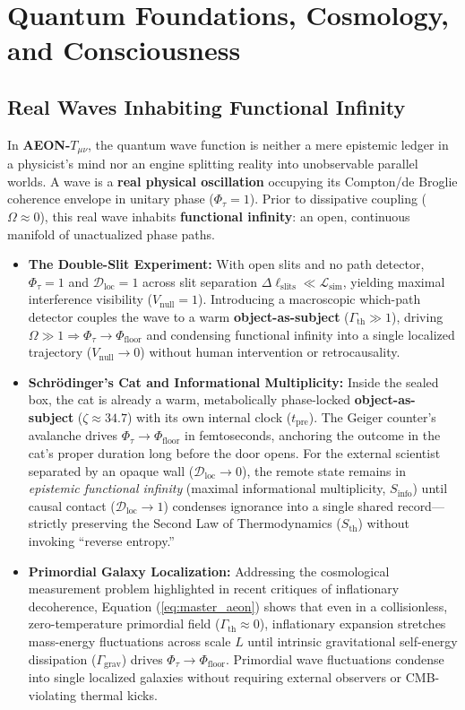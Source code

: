 \documentclass[11pt,a4paper]{article}
\begin{document}
\section{Quantum Foundations, Cosmology, and Consciousness}

\subsection{Real Waves Inhabiting Functional Infinity}
In \textbf{AEON-$T_{\mu\nu}$}, the quantum wave function is neither a mere epistemic ledger in a physicist's mind nor an engine splitting reality into unobservable parallel worlds. A wave is a \textbf{real physical oscillation} occupying its Compton/de Broglie coherence envelope in unitary phase ($\Phi_\tau = 1$). Prior to dissipative coupling ($\Omega \approx 0$), this real wave inhabits \textbf{functional infinity}: an open, continuous manifold of unactualized phase paths.

\begin{itemize}[leftmargin=1.5em]
    \item \textbf{The Double-Slit Experiment:} With open slits and no path detector, $\Phi_\tau = 1$ and $\mathcal{D}_{\text{loc}} = 1$ across slit separation $\Delta\ell_{\text{slits}} \ll \mathcal{L}_{\text{sim}}$, yielding maximal interference visibility ($V_{\text{null}} = 1$). Introducing a macroscopic which-path detector couples the wave to a warm \textbf{object-as-subject} ($\Gamma_{\text{th}} \gg 1$), driving $\Omega \gg 1 \Rightarrow \Phi_\tau \to \Phi_{\text{floor}}$ and condensing functional infinity into a single localized trajectory ($V_{\text{null}} \to 0$) without human intervention or retrocausality.
    \item \textbf{Schrödinger's Cat and Informational Multiplicity:} Inside the sealed box, the cat is already a warm, metabolically phase-locked \textbf{object-as-subject} ($\zeta \approx 34.7$) with its own internal clock ($t_{\text{pre}}$). The Geiger counter's avalanche drives $\Phi_\tau \to \Phi_{\text{floor}}$ in femtoseconds, anchoring the outcome in the cat's proper duration long before the door opens. For the external scientist separated by an opaque wall ($\mathcal{D}_{\text{loc}} \to 0$), the remote state remains in \textit{epistemic functional infinity} (maximal informational multiplicity, $S_{\text{info}}$) until causal contact ($\mathcal{D}_{\text{loc}} \to 1$) condenses ignorance into a single shared record---strictly preserving the Second Law of Thermodynamics ($S_{\text{th}}$) without invoking ``reverse entropy.''
    \item \textbf{Primordial Galaxy Localization:} Addressing the cosmological measurement problem highlighted in recent critiques of inflationary decoherence, Equation (\ref{eq:master_aeon}) shows that even in a collisionless, zero-temperature primordial field ($\Gamma_{\text{th}} \approx 0$), inflationary expansion stretches mass-energy fluctuations across scale $L$ until intrinsic gravitational self-energy dissipation ($\Gamma_{\text{grav}}$) drives $\Phi_\tau \to \Phi_{\text{floor}}$. Primordial wave fluctuations condense into single localized galaxies without requiring external observers or CMB-violating thermal kicks.
\end{itemize}
\end{document}
